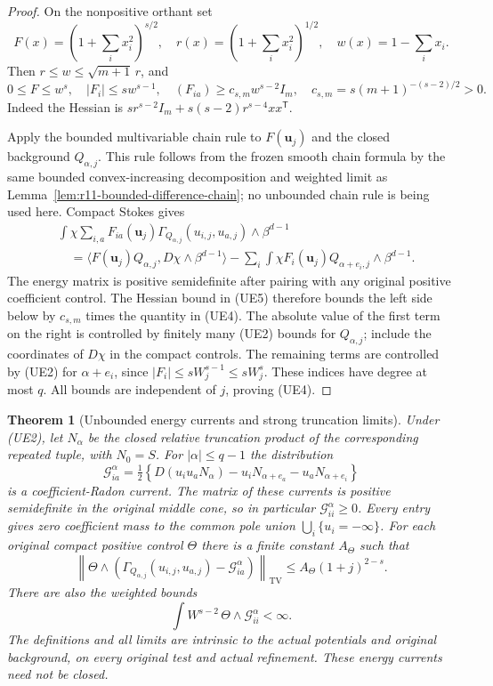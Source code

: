 \documentclass[11pt,a4paper]{article}
\numberwithin{equation}{section}
\newtheorem{theorem}{Theorem}[section]
\theoremstyle{definition}
\theoremstyle{remark}
\begin{document}
\begin{proof}
On the nonpositive orthant set
\[
 F(x)=(1+\sum_i x_i^2)^{s/2},\quad
 r(x)=(1+\sum_i x_i^2)^{1/2},\quad
 w(x)=1-\sum_i x_i.
\]
Then $r\leq w\leq\sqrt{m+1}\,r$, and
\[
 0\leq F\leq w^s,\quad |F_i|\leq s w^{s-1},\quad
 (F_{ia})\geq c_{s,m}w^{s-2}I_m,
 \quad c_{s,m}=s(m+1)^{-(s-2)/2}>0.
 \tag{UE5}
\]
Indeed the Hessian is
$s r^{s-2}I_m+s(s-2)r^{s-4}xx^{\mathsf T}$.

Apply the bounded multivariable chain rule to $F(\mathbf u_j)$
and the closed background $Q_{\alpha,j}$.  This rule follows from
the frozen smooth chain formula by the same bounded convex-increasing
decomposition and weighted limit as
Lemma~\ref{lem:r11-bounded-difference-chain}; no unbounded chain
rule is being used here.  Compact Stokes gives
\begin{align*}
 &\int\chi\sum_{i,a}F_{ia}(\mathbf u_j)
       \Gamma_{Q_{\alpha,j}}(u_{i,j},u_{a,j})\wedge\beta^{d-1}\\
 &\quad=\langle F(\mathbf u_j)Q_{\alpha,j},
                                  D\chi\wedge\beta^{d-1}\rangle
     -\sum_i\int\chi F_i(\mathbf u_j)
                              Q_{\alpha+e_i,j}\wedge\beta^{d-1}.
 \tag{UE6}
\end{align*}
The energy matrix is positive semidefinite after pairing with any
original positive coefficient control.  The Hessian bound in (UE5)
therefore bounds the left side below by $c_{s,m}$ times the quantity
in (UE4).  The absolute value of the first term on the right is
controlled by finitely many (UE2) bounds for $Q_{\alpha,j}$; include
the coordinates of $D\chi$ in the compact controls.  The remaining
terms are controlled by (UE2) for $\alpha+e_i$, since
$|F_i|\leq sW_j^{s-1}\leq sW_j^s$.  These indices have degree at
most $q$.  All bounds are independent of $j$, proving (UE4).
\end{proof}

\begin{theorem}[Unbounded energy currents and strong truncation limits]
\label{thm:r11-unbounded-energy-current}
Under (UE2), let $N_\alpha$ be the closed relative truncation product
of the corresponding repeated tuple, with $N_0=S$.
For $|\alpha|\leq q-1$ the distribution
\[
 \mathcal G^\alpha_{ia}
 =\tfrac12\left\{D(u_i u_aN_\alpha)
             -u_iN_{\alpha+e_a}-u_aN_{\alpha+e_i}\right\}
 \tag{UE7}
\]
is a coefficient-Radon current.  The matrix of these currents is
positive semidefinite in the original middle cone, so in particular
$\mathcal G^\alpha_{ii}\geq0$.  Every entry gives zero coefficient
mass to the common pole union $\bigcup_i\{u_i=-\infty\}$.
For each original compact positive control $\Theta$ there is a
finite constant $A_\Theta$ such that
\[
 \left\|\Theta\wedge\left(
       \Gamma_{Q_{\alpha,j}}(u_{i,j},u_{a,j})
                          -\mathcal G^\alpha_{ia}\right)\right\|_{\mathrm{TV}}
                         \leq A_\Theta(1+j)^{2-s}.
 \tag{UE8}
\]
There are also the weighted bounds
\[
 \int W^{s-2}\,\Theta\wedge\mathcal G^\alpha_{ii}<\infty.
 \tag{UE9}
\]
The definitions and all limits are intrinsic to the actual potentials
and original background, on every original test and actual refinement.
These energy currents need not be closed.
\end{theorem}
\end{document}

